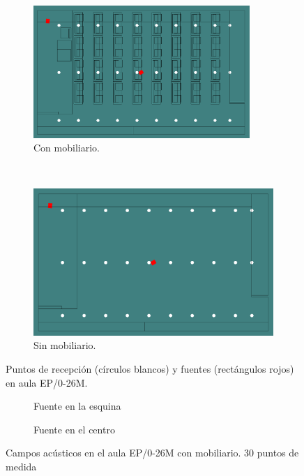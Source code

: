 \begin{figure}[ht]
    \centering
    \begin{subfigure}[b]{0.4\textwidth}
    	\centering
        \includegraphics[width=0.9\textwidth]{archivos/receptoreseps.png}
        \caption{Con mobiliario.}
    \end{subfigure}
    ~ %
    \begin{subfigure}[b]{0.4\textwidth}
    	\centering
        \includegraphics[width=0.9\linewidth]{archivos/receptoresepsv.png}
        \caption{Sin mobiliario.}
    \end{subfigure}
    \caption{Puntos de recepción (círculos blancos) y fuentes (rectángulos rojos) en aula EP/0-26M.}\label{im:receptoreseps}
\end{figure}
\FloatBarrier 


\begin{figure}[ht]
    \begin{subfigure}[b]{0.4\textwidth}
    	\centering%
         {%
    }
    \caption{Fuente en la esquina}%
    \end{subfigure}%
    \hspace{1.9cm}%
    \begin{subfigure}[b]{0.4\textwidth}%
    	\centering%
        {%
    }
    \caption{Fuente en el centro}%
    \end{subfigure}
    \caption{Campos acústicos en el aula EP/0-26M con mobiliario. 30 puntos de medida}
    \label{graf:epsmob}%
\end{figure}
\FloatBarrier 

